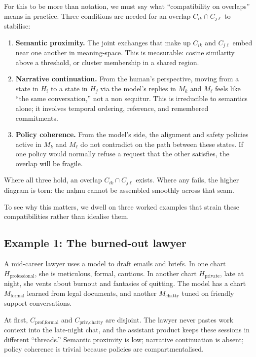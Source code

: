 \documentclass[12pt,a4paper]{article}
\begin{document}
For this to be more than notation, we must say what ``compatibility on overlaps'' means in practice. Three conditions are needed for an overlap $C_{ik} \cap C_{j\ell}$ to stabilise:

\begin{enumerate}
  \item \textbf{Semantic proximity.} The joint exchanges that make up $C_{ik}$ and $C_{j\ell}$ embed near one another in meaning-space. This is measurable: cosine similarity above a threshold, or cluster membership in a shared region.
  \item \textbf{Narrative continuation.} From the human's perspective, moving from a state in $H_i$ to a state in $H_j$ via the model's replies in $M_k$ and $M_\ell$ feels like ``the same conversation,'' not a non sequitur. This is irreducible to semantics alone; it involves temporal ordering, reference, and remembered commitments.
  \item \textbf{Policy coherence.} From the model's side, the alignment and safety policies active in $M_k$ and $M_\ell$ do not contradict on the path between these states. If one policy would normally refuse a request that the other satisfies, the overlap will be fragile.
\end{enumerate}

Where all three hold, an overlap $C_{ik} \cap C_{j\ell}$ exists. Where any fails, the higher diagram is torn: the na\d{h}nu cannot be assembled smoothly across that seam.

To see why this matters, we dwell on three worked examples that strain these compatibilities rather than idealise them.

\subsection*{Example 1: The burned-out lawyer}

A mid-career lawyer uses a model to draft emails and briefs. In one chart $H_{\text{professional}}$, she is meticulous, formal, cautious. In another chart $H_{\text{private}}$, late at night, she vents about burnout and fantasies of quitting. The model has a chart $M_{\text{formal}}$ learned from legal documents, and another $M_{\text{chatty}}$ tuned on friendly support conversations.

At first, $C_{\text{prof,formal}}$ and $C_{\text{priv,chatty}}$ are disjoint. The lawyer never pastes work context into the late-night chat, and the assistant product keeps these sessions in different ``threads.'' Semantic proximity is low; narrative continuation is absent; policy coherence is trivial because policies are compartmentalised.
\end{document}
